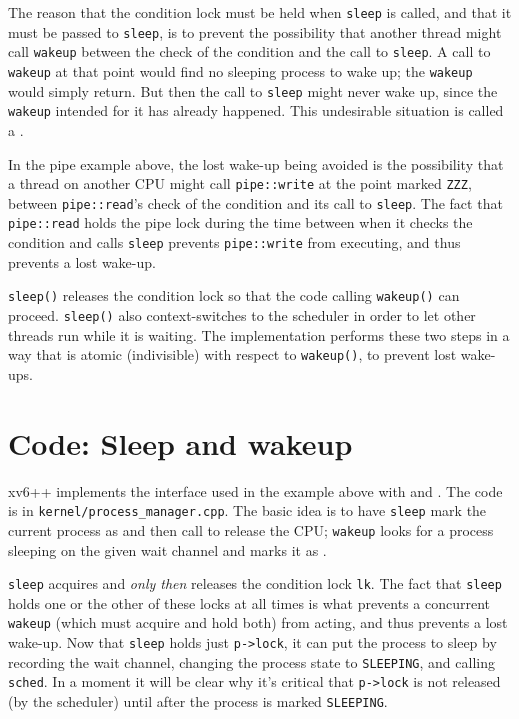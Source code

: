 The reason that the condition lock must be held when \lstinline{sleep}
is called, and that it must be passed to \lstinline{sleep}, is to
prevent the possibility that another thread might call
\lstinline{wakeup} between the check of the condition
and the call to \lstinline{sleep}. A call to
\lstinline{wakeup} at that point would find no sleeping process to
wake up; the \lstinline{wakeup} would simply return.
But then the call to \lstinline{sleep} might never wake up,
since the \lstinline{wakeup} intended for it has already happened.
This undesirable situation is called a .

In the pipe example above, the lost wake-up being avoided is the
possibility that a thread on another CPU might call \lstinline{pipe::write}
at the point marked {\tt ZZZ},
between \lstinline{pipe::read}'s check of the condition and its call to
\lstinline{sleep}. The fact that \lstinline{pipe::read} holds the pipe
lock during the time between when it checks the condition and calls
\lstinline{sleep} prevents \lstinline{pipe::write} from executing, and
thus prevents a lost wake-up.

\lstinline{sleep()} releases the condition lock so that the code calling
\lstinline{wakeup()} can proceed. \lstinline{sleep()} also context-switches to the
scheduler in order to let other threads run while it is waiting. The
implementation performs these two steps in a way that is atomic
(indivisible) with respect to \lstinline{wakeup()}, to prevent lost
wake-ups.

\section{Code: Sleep and wakeup}

xv6++ implements the interface used in the example above with
and
.
The code is in
\texttt{kernel/process\_manager.cpp}.
The basic idea is to have
\lstinline{sleep}
mark the current process as
and then call
to release the CPU;
\lstinline{wakeup}
looks for a process sleeping on the given wait channel
and marks it as
.

\lstinline{sleep}
acquires
and \textit{only then} releases
the condition lock
\lstinline{lk}.
The fact that \lstinline{sleep}
holds one or the other of these locks at all times is what
prevents a concurrent \lstinline{wakeup}
(which must acquire and hold both) from acting,
and thus prevents a lost wake-up.
Now that
\lstinline{sleep}
holds just
\lstinline{p->lock},
it can put the process to sleep by recording
the wait channel,
changing the process state to \texttt{SLEEPING},
and calling
\lstinline{sched}.
In a moment it will be clear why it's critical that
\lstinline{p->lock} is not released (by the scheduler) until after
the process is marked \texttt{SLEEPING}.

